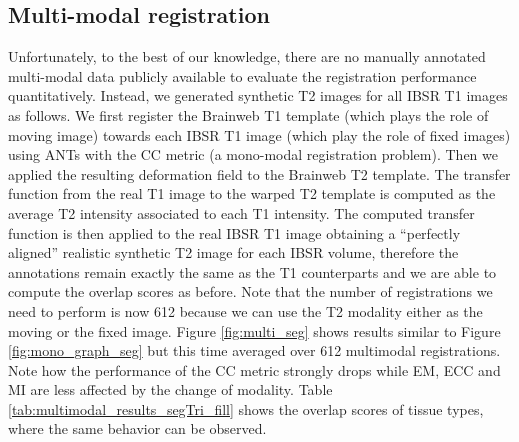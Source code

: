\subsection{Multi-modal registration}\label{sec:multimodal_results}

Unfortunately, to the best of our knowledge, there are no manually annotated multi-modal data publicly available to evaluate the registration performance quantitatively. Instead, we generated synthetic T2 images for all IBSR T1 images as follows. We first register the Brainweb T1 template (which plays the role of moving image) towards each IBSR T1 image (which play the role of fixed images) using ANTs with the CC metric (a mono-modal registration problem). Then we applied the resulting deformation field to the Brainweb T2 template. The transfer function from the real T1 image to the warped T2 template is computed as the average T2 intensity associated to each T1 intensity. The computed transfer function is then applied to the real IBSR T1 image obtaining a ``perfectly aligned'' realistic synthetic T2 image for each IBSR volume, therefore the annotations remain exactly the same as the T1 counterparts and we are able to compute the overlap scores as before. Note that the number of registrations we need to perform is now 612 because we can use the T2 modality either as the moving or the fixed image. Figure \ref{fig:multi_seg} shows results similar to Figure \ref{fig:mono_graph_seg} but this time averaged over 612 multimodal registrations. Note how the performance of the CC metric strongly drops while EM, ECC and MI are less affected by the change of modality. Table \ref{tab:multimodal_results_segTri_fill} shows the overlap scores of tissue types, where the same behavior can be observed.\\

